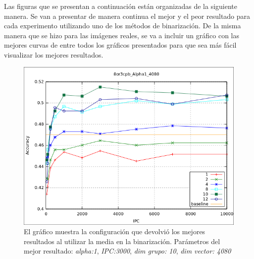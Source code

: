     Las figuras que se presentan a continuación están organizadas de la siguiente manera. Se van a presentar de manera continua el mejor y el peor resultado para cada experimento utilizando uno de los métodos de binarización. De la misma manera que se hizo para las imágenes reales, se va a incluir un gráfico con las mejores curvas de entre todos los gráficos presentados para que sea más fácil visualizar los mejores resultados.


			\begin{figure}[htbp]
				\centering
				\includegraphics[scale=0.6]{img/resultados/sinteticas/best_media_8or3cpb_Alpha1_4080.png}
				\caption[Sintéticas media mejor resultado]{El gráfico muestra la configuración que devolvió los mejores resultados al utilizar la media en la binarización. Parámetros del mejor resultado: \textit{alpha:1}, \textit{IPC:3000}, \textit{dim grupo: 10}, \textit{dim vector: 4080}}
				\label{fig: Sinteticas-media-mejor}
			\end{figure}
			
